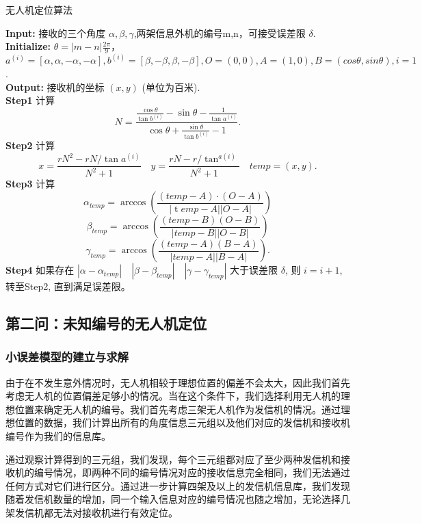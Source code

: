 \documentclass{my_paper}
\begin{document}
\begin{algorithm}[H]
\caption{\small 无人机定位算法}
\textbf{Input:} 接收的三个角度 $\alpha,\beta,\gamma$,两架信息外机的编号m,n，可接受误差限 $\delta$.\\
\textbf{Initialize:} $\theta=|m-n|\frac{2\pi}{9}$，$a^{(i)} = [\alpha,\alpha,-\alpha,-\alpha],b ^{(i)}= [\beta,-\beta,\beta,-\beta],O=(0,0),A=(1,0),B=(cos\theta,sin\theta),i=1$.\\
\textbf{Output:} 接收机的坐标 $(x,y)$ (单位为百米). \\
\textbf{Step1} 计算 $$N = \frac { \frac { \cos \theta } { \tan b^{(i)} } - \sin \theta - \frac { 1 } { \tan a^{(i)} } } { \cos \theta + \frac { \sin \theta } { \tan b^{(i)} } - 1 }.$$
\textbf{Step2} 计算 $$x= \frac { r N ^ { 2 } - r N / \tan a^{(i)} } { N ^ { 2 } + 1 } \quad y = \frac { r N - r / \tan ^{a(i)} } { N ^ { 2 } + 1 }\quad temp=(x,y).$$
\textbf{Step3} 计算 $$\alpha _ { t e m p } = \arccos ( \frac { ( temp  - A ) \cdot ( O - A ) } { | \operatorname temp - A | | O - A | } )$$ $$\beta _{ temp} = \arccos ( \frac { ( temp - B ) ( O - B ) } { | temp - B | | O - B | } )$$ $$\gamma_ { temp } = \arccos ( \frac { ( temp - A ) ( B - A ) } { |  temp - A | | B - A | } ).$$
\textbf{Step4} 如果存在 $|\alpha-\alpha_{temp}|\quad|\beta-\beta_{temp}|\quad|\gamma-\gamma_{temp}|$ 大于误差限 $\delta$, 则 $i=i+1$, 转至Step2, 直到满足误差限。
\end{algorithm}

\subsection{第二问：未知编号的无人机定位}
\subsubsection{小误差模型的建立与求解}
由于在不发生意外情况时，无人机相较于理想位置的偏差不会太大，因此我们首先考虑无人机的位置偏差足够小的情况。当在这个条件下，我们选择利用无人机的理想位置来确定无人机的编号。我们首先考虑三架无人机作为发信机的情况。通过理想位置的数据，我们计算出所有的角度信息三元组以及他们对应的发信机和接收机编号作为我们的信息库。

通过观察计算得到的三元组，我们发现，每个三元组都对应了至少两种发信机和接收机的编号情况，即两种不同的编号情况对应的接收信息完全相同，我们无法通过任何方式对它们进行区分。通过进一步计算四架及以上的发信机信息库，我们发现随着发信机数量的增加，同一个输入信息对应的编号情况也随之增加，无论选择几架发信机都无法对接收机进行有效定位。
\end{document}
